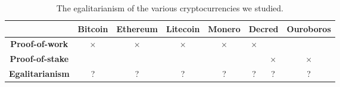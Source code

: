 
\begin{table}
  \centering
  \begin{tabular}{|c|c|c|c|c|c|c|c|}
    \hline
    & Bitcoin & Ethereum & Litecoin & Monero & \multicolumn{2}{c|}{Decred} & Ouroboros\\
    \hline
    \textbf{Proof-of-work} &
    $\times$ & $\times$ & $\times$ & $\times$ & $\times$ & & \\
    \hline
    \textbf{Proof-of-stake} &
    & & & & & $\times$ & $\times$ \\
    \hline
    \textbf{Egalitarianism} &
    ? & ? & ? & ? & ? & ? & ? \\
    \hline
  \end{tabular}
  \caption{The egalitarianism of the various cryptocurrencies we studied.}
  \label{tbl:egalitarianism}
\end{table}


